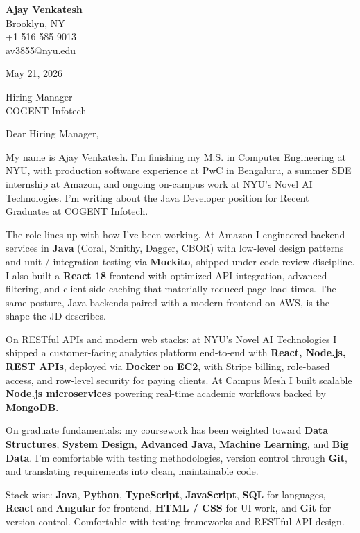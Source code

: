 \documentclass[letterpaper,11pt]{article}
\begin{document}
\begin{flushleft}
\textbf{\large Ajay Venkatesh} \\
Brooklyn, NY \\
+1 516 585 9013 \\
\href{mailto:av3855@nyu.edu}{av3855@nyu.edu}
\end{flushleft}
\vspace{10pt}
May 21, 2026
\vspace{6pt}

Hiring Manager \\
COGENT Infotech

\vspace{10pt}

Dear Hiring Manager,

My name is Ajay Venkatesh. I'm finishing my M.S. in Computer Engineering at NYU, with production software experience at PwC in Bengaluru, a summer SDE internship at Amazon, and ongoing on-campus work at NYU's Novel AI Technologies. I'm writing about the Java Developer position for Recent Graduates at COGENT Infotech.

The role lines up with how I've been working. At Amazon I engineered backend services in \textbf{Java} (Coral, Smithy, Dagger, CBOR) with low-level design patterns and unit / integration testing via \textbf{Mockito}, shipped under code-review discipline. I also built a \textbf{React 18} frontend with optimized API integration, advanced filtering, and client-side caching that materially reduced page load times. The same posture, Java backends paired with a modern frontend on AWS, is the shape the JD describes.

On RESTful APIs and modern web stacks: at NYU's Novel AI Technologies I shipped a customer-facing analytics platform end-to-end with \textbf{React, Node.js, REST APIs}, deployed via \textbf{Docker} on \textbf{EC2}, with Stripe billing, role-based access, and row-level security for paying clients. At Campus Mesh I built scalable \textbf{Node.js microservices} powering real-time academic workflows backed by \textbf{MongoDB}.

On graduate fundamentals: my coursework has been weighted toward \textbf{Data Structures}, \textbf{System Design}, \textbf{Advanced Java}, \textbf{Machine Learning}, and \textbf{Big Data}. I'm comfortable with testing methodologies, version control through \textbf{Git}, and translating requirements into clean, maintainable code.

Stack-wise: \textbf{Java}, \textbf{Python}, \textbf{TypeScript}, \textbf{JavaScript}, \textbf{SQL} for languages, \textbf{React} and \textbf{Angular} for frontend, \textbf{HTML / CSS} for UI work, and \textbf{Git} for version control. Comfortable with testing frameworks and RESTful API design.
\end{document}
